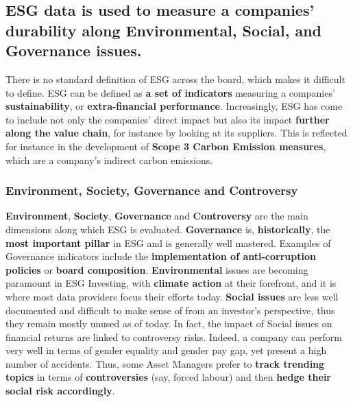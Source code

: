 \documentclass[12pt]{report}
\begin{document}
\subsection{ESG data is used to measure a companies’ durability along Environmental, Social, and Governance issues.}

There is no standard definition of ESG across the board, which makes it difficult to define. ESG can be defined as \textbf{a set of indicators} measuring a companies’ \textbf{sustainability}, or \textbf{extra-financial performance}. Increasingly, ESG has come to include not only the companies’ direct impact but also its impact \textbf{further along the value chain}, for instance by looking at its suppliers. This is reflected for instance in the development of \textbf{Scope 3 Carbon Emission measures}, which are a company's indirect carbon emissions. 

\subsubsection{Environment, Society, Governance and Controversy}
\textbf{Environment}, \textbf{Society}, \textbf{Governance} and \textbf{Controversy} are the main dimensions along which ESG is evaluated.\newline
\textbf{Governance} is, \textbf{historically}, the \textbf{most important pillar} in ESG and is generally well mastered. Examples of Governance indicators include the \textbf{implementation of anti-corruption policies} or \textbf{board composition}. \textbf{Environmental} issues are becoming paramount in ESG Investing, with \textbf{climate action} at their forefront, and it is where most data providers focus their efforts today. \textbf{Social issues} are less well documented and difficult to make sense of from an investor's perspective, thus they remain mostly unused as of today. In fact, the impact of Social issues on financial returns are linked to controversy risks. Indeed, a company can perform very well in terms of gender equality and gender pay gap, yet present a high number of accidents. Thus, some Asset Managers prefer to \textbf{track trending topics} in terms of \textbf{controversies} (say, forced labour) and then \textbf{hedge their social risk accordingly}. 
\end{document}
